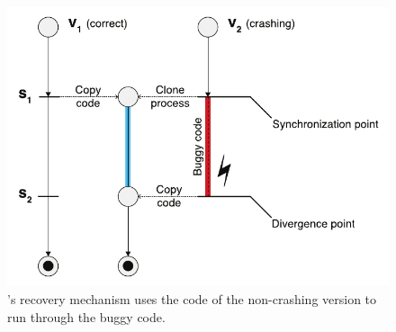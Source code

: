 

\begin{figure}[t]
\centering
\includegraphics[width=0.8\columnwidth]{safe-updates/figures/strategy}
\caption{\rem's recovery mechanism uses the code of the non-crashing
  version to run through the buggy code.}
\label{fig:solution3}
\end{figure}


